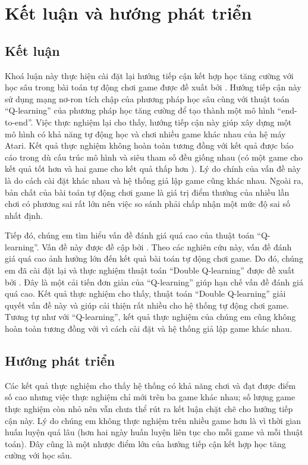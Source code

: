 \chapter{Kết luận và hướng phát triển}
\section{Kết luận}
	Khoá luận này thực hiện cài đặt lại hướng tiếp cận kết hợp học tăng cường với học sâu trong bài toán tự động chơi game được đề xuất bởi \cite{mnihdqn2015}.
	Hướng tiếp cận này sử dụng mạng nơ-ron tích chập của phương pháp học sâu cùng với thuật toán ``Q-learning'' của phương pháp học tăng cường để tạo thành một mô hình ``end-to-end''.
	Việc thực nghiệm lại cho thấy, hướng tiếp cận này giúp xây dựng một mô hình có khả năng tự động học và chơi nhiều game khác nhau của hệ máy Atari.
	Kết quả thực nghiệm không hoàn toàn tương đồng với kết quả được báo cáo trong \cite{mnihdqn2015} dù cấu trúc mô hình và siêu tham số đều giống nhau (có một game cho kết quả tốt hơn \cite{mnihdqn2015} và hai game cho kết quả thấp hơn \cite{mnihdqn2015}).
	Lý do chính của vấn đề này là do cách cài đặt khác nhau và hệ thống giả lập game cũng khác nhau.
	Ngoài ra, bản chất của bài toán tự động chơi game là giá trị điểm thưởng của nhiều lần chơi có phương sai rất lớn nên việc so sánh phải chấp nhận một mức độ sai số nhất định.
	
	Tiếp đó, chúng em tìm hiểu vấn đề đánh giá quá cao của thuật toán ``Q-learning''.
	Vấn đề này được đề cập bởi \cite{hasselt2010double, van2015deep}.
	Theo các nghiên cứu này, vấn đề đánh giá quá cao ảnh hưởng lớn đến kết quả bài toán tự động chơi game.
	Do đó, chúng em đã cài đặt lại và thực nghiệm thuật toán ``Double Q-learning'' được đề xuất bởi \cite{van2015deep}.
	Đây là một cải tiến đơn giản của ``Q-learning'' giúp hạn chế vấn đề đánh giá quá cao.
	Kết quả thực nghiệm cho thấy, thuật toán ``Double Q-learning'' giải quyết vấn đề này và giúp cải thiện 	rất nhiều cho hệ thống tự động chơi game.
	Tương tự như với ``Q-learning'', kết quả thực nghiệm của chúng em cũng không hoàn toàn tương đồng với \cite{van2015deep} vì cách cài đặt và hệ thống giả lập game khác nhau.

\section{Hướng phát triển}
	Các kết quả thực nghiệm cho thấy hệ thống có khả năng chơi và đạt được điểm số cao nhưng việc thực nghiệm chỉ mới trên ba game khác nhau; số lượng game thực nghiệm còn nhỏ nên vẫn chưa thể rút ra kết luận chặt chẽ cho hướng tiếp cận này.
	Lý do chúng em không thực nghiệm trên nhiều game hơn là vì thời gian huấn luyện quá lâu (hơn hai ngày huấn luyện liên tục cho mỗi game và mỗi thuật toán).
	Đây cũng là một nhược điểm lớn của hướng tiếp cận kết hợp học tăng cường với học sâu.
	
